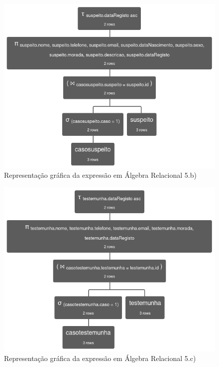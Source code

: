 \documentclass[a4paper,12pt]{scrreprt}
\begin{document}
\clearpage

\begin{figure}[!ht]
    \centering
    \includegraphics[scale=0.7]{images/relax/5-b.png}
    \caption{Representação gráfica da expressão em Álgebra Relacional 5.b)}
    \label{fig:4.6}
\end{figure}

\clearpage

\begin{figure}[!ht]
    \centering
    \includegraphics[scale=0.65]{images/relax/5-c.png}
    \caption{Representação gráfica da expressão em Álgebra Relacional 5.c)}
    \label{fig:4.7}
\end{figure}
\end{document}
